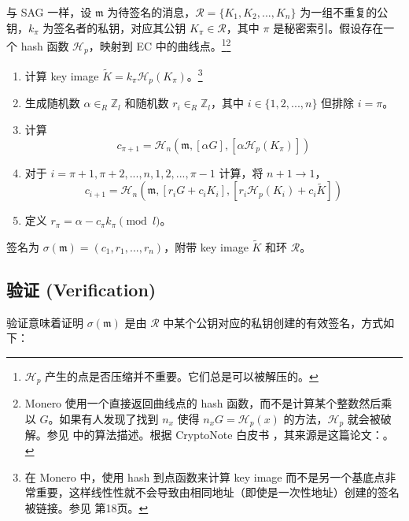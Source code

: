 与 SAG 一样，设 \(\mathfrak{m}\) 为待签名的消息，\(\mathcal{R} = \{K_1, K_2, ..., K_n\}\) 为一组不重复的公钥，\(k_\pi\) 为签名者的私钥，对应其公钥 \(K_\pi \in \mathcal{R}\)，其中 $\pi$ 是秘密索引。假设存在一个 hash 函数 \(\mathcal{H}_p\)，映射到 EC 中的曲线点。\footnote{$\mathcal{H}_p$ 产生的点是否压缩并不重要。它们总是可以被解压的。}\footnote{Monero 使用一个直接返回曲线点的 hash 函数，而不是计算某个整数然后乘以 $G$。如果有人发现了找到 $n_x$ 使得 $n_x G = \mathcal{H}_p(x)$ 的方法，$\mathcal{H}_p$ 就会被破解。参见 \cite{hashtopoint-writeup} 中的算法描述。根据 CryptoNote 白皮书 \cite{cryptoNoteWhitePaper}，其来源是这篇论文：\cite{hashtopoint-original-paper}。}

\begin{enumerate}
	\item 计算 key image \(\tilde{K} = k_\pi \mathcal{H}_p(K_\pi)\)。\footnote{在 Monero 中，使用 hash 到点函数来计算 key image 而不是另一个基底点非常重要，这样线性性就不会导致由相同地址（即使是一次性地址）创建的签名被链接。参见 \cite{cryptoNoteWhitePaper} 第18页。}

	\item 生成随机数 \(\alpha \in_R \mathbb{Z}_l\) 和随机数 \(r_i \in_R \mathbb{Z}_l\)，其中 \(i \in \{1, 2, ..., n\}\) 但排除 \(i = \pi\)。

	\item 计算
	\[c_{\pi+1} = \mathcal{H}_n(\mathfrak{m}, [\alpha G], [\alpha \mathcal{H}_p(K_\pi)])\]

	\item 对于 \(i = \pi+1, \pi+2, ..., n, 1, 2, ..., \pi-1\) 计算，将 \(n + 1 \rightarrow 1\)，\vspace{.175cm}
	\[c_{i+1} = \mathcal{H}_n(\mathfrak{m}, [r_i G + c_i K_i], [r_i \mathcal{H}_p(K_i) + c_i \tilde{K}])\]

	\item 定义 \(r_\pi = \alpha - c_\pi k_\pi \pmod l\)。
\end{enumerate}

签名为 \(\sigma(\mathfrak{m}) = (c_1, r_1, ..., r_n)\)，附带 key image $\tilde{K}$ 和环 $\mathcal{R}$。


\subsection*{验证 (Verification)}

验证意味着证明 $\sigma(\mathfrak{m})$ 是由 $\mathcal{R}$ 中某个公钥对应的私钥创建的有效签名，方式如下：

